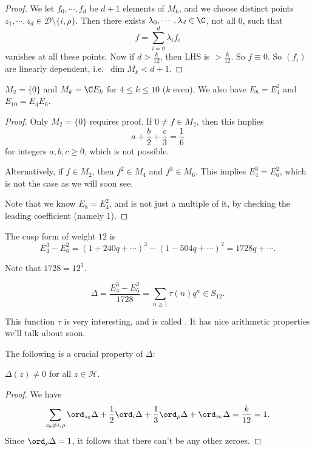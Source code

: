\documentclass[a4paper]{article}
\renewcommand{\H}{\mathcal{H}}
\begin{document}
\begin{proof}
  We let $f_0, \cdots, f_d$ be $d + 1$ elements of $M_k$, and we choose distinct points $z_1, \cdots, z_d \in \mathcal{D} \setminus \{i, \rho\}$. Then there exists $\lambda_0, \cdots, \lambda_d \in \C$, not all $0$, such that
  \[
    f = \sum_{i = 0}^d \lambda_i f_i
  \]
  vanishes at all these points. Now if $d > \frac{k}{12}$, then LHS is $> \frac{k}{12}$. So $f \equiv 0$. So $(f_i)$ are linearly dependent, i.e.\ $\dim M_k < d + 1$.
\end{proof}

\begin{cor}\leavevmode
  $M_2 = \{0\}$ and $M_k = \C E_k$ for $4 \leq k \leq 10$ ($k$ even). We also have $E_8 = E_4^2$ and $E_{10} = E_4 E_6$.
\end{cor}

\begin{proof}
  Only $M_2 = \{0\}$ requires proof. If $0 \not= f \in M_2$, then this implies
  \[
    a + \frac{b}{2} + \frac{c}{3} = \frac{1}{6}
  \]
  for integers $a, b, c \geq 0$, which is not possible.

  Alternatively, if $f \in M_2$, then $f^2 \in M_4$ and $f^3 \in M_6$. This implies $E_4^3 = E_6^2$, which is not the case as we will soon see.

  Note that we know $E_8 = E_4^2$, and is not just a multiple of it, by checking the leading coefficient (namely 1).
\end{proof}

\begin{cor}
  The cusp form of weight $12$ is
  \[
    E_4^3 - E_6^2 = (1 + 240 q + \cdots)^3 - (1 - 504 q + \cdots)^2 = 1728q + \cdots.
  \]
\end{cor}
Note that $1728 = 12^3$.

\begin{defi}\index{$\Delta$}
  \[
    \Delta = \frac{E_4^3 - E_6^2}{1728} = \sum_{n \geq 1} \tau(n) q^n \in S_{12}.
  \]
\end{defi}
This function $\tau$ is very interesting, and is called . It has nice arithmetic properties we'll talk about soon.

The following is a crucial property of $\Delta$:
\begin{prop}
  $\Delta(z) \not= 0$ for all $z \in \H$.
\end{prop}

\begin{proof}
  We have
  \[
    \sum_{z_0 \not= i, \rho} \ord_{z_0} \Delta + \frac{1}{2} \ord_i \Delta + \frac{1}{3} \ord_\rho \Delta + \ord_\infty \Delta = \frac{k}{12} = 1.
  \]
  Since $\ord_\rho \Delta = 1$, it follows that there can't be any other zeroes.
\end{proof}
\end{document}

